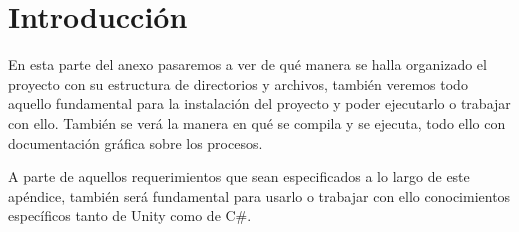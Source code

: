 \section{Introducción}
En esta parte del anexo pasaremos a ver de qué manera se halla organizado el proyecto con su estructura de directorios y archivos, también veremos todo aquello fundamental para la instalación del proyecto y poder ejecutarlo o trabajar con ello. También se verá la manera en qué se compila y se ejecuta, todo ello con documentación gráfica sobre los procesos. 

A parte de aquellos requerimientos que sean especificados a lo largo de este apéndice, también será fundamental para usarlo o trabajar con ello conocimientos específicos tanto de Unity como de C\#.

